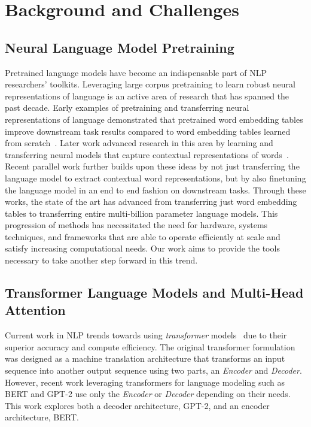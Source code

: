 \documentclass{article}
\begin{document}
\section{Background and Challenges}
\subsection{Neural Language Model Pretraining} 

Pretrained language models have become an indispensable part of NLP researchers' toolkits. Leveraging large corpus pretraining to learn robust neural representations of language is an active area of research that has spanned the past decade. Early examples of pretraining and transferring neural representations of language demonstrated that pretrained word embedding tables improve downstream task results compared to word embedding tables learned from scratch~\cite{Mikolov2013,Pennington2014,Turian2010}. 
Later work advanced research in this area by learning and transferring neural models that capture contextual representations of words~\citep{context2vec, Cove, ELMo, Radford2017Sentiment, Radford2019GPT2}. Recent parallel work \citep{Le2016seq2seqtransfer, Howard2018ULMFIT, Radford2018GPT, devlin2018bert, roberta, transformerxl,xlnet,mtdnn,ALBERT2019} further builds upon these ideas by not just transferring the language model to extract contextual word representations, but by also finetuning the language model in an end to end fashion on downstream tasks. Through these works, the state of the art has advanced from transferring just word embedding tables to transferring entire multi-billion parameter language models. This progression of methods has necessitated the need for hardware, systems techniques, and frameworks that are able to operate efficiently at scale and satisfy increasing computational needs. Our work aims to provide the tools necessary to take another step forward in this trend.

\subsection{Transformer Language Models and Multi-Head Attention} 

Current work in NLP trends towards using {\it transformer} models~\cite{Transformer} due to their superior accuracy and compute efficiency. The original transformer formulation was designed as a machine translation architecture that transforms an input sequence into another output sequence using two parts, an {\it Encoder} and {\it Decoder}. However, recent work leveraging transformers for language modeling such as BERT \cite{devlin2018bert} and GPT-2 \cite{Radford2019GPT2} use only the {\it Encoder} or {\it Decoder} depending on their needs. This work explores both a decoder architecture, GPT-2, and an encoder architecture, BERT. 
\end{document}
